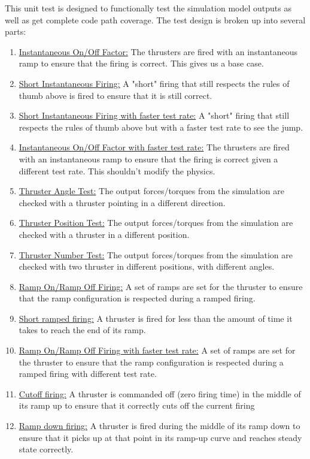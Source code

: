 \noindent This unit test is designed to functionally test the simulation model 
outputs as well as get complete code path coverage.  The test design is broken 
up into several parts:\\
\begin{enumerate}
\item{\underline{Instantaneous On/Off Factor:} The thrusters are fired with an 
  instantaneous ramp to ensure that the firing is correct. This gives us a base case.}
\item{\underline{Short Instantaneous Firing:} A "short" firing that still respects the 
  rules of thumb above is fired to ensure that it is still correct.}
 \item{\underline{Short Instantaneous Firing with faster test rate:} A "short" firing that still respects the 
  rules of thumb above but with a faster test rate to see the jump.}
 \item{\underline{Instantaneous On/Off Factor with faster test rate:} The thrusters are fired with an 
  instantaneous ramp to ensure that the firing is correct given a different test rate. This shouldn't modify the physics.}
 \item{\underline{Thruster Angle Test:} The output forces/torques from the simulation 
  are checked with a thruster pointing in a different direction.}
   \item{\underline{Thruster Position Test:} The output forces/torques from the simulation 
  are checked with a thruster in a different position.}
   \item{\underline{Thruster Number Test:} The output forces/torques from the simulation 
  are checked with two thruster in different positions, with different angles.}
\item{\underline{Ramp On/Ramp Off Firing:} A set of ramps are set for the thruster to ensure 
  that the ramp configuration is respected during a ramped firing.}
  \item{\underline{Short ramped firing:} A thruster is fired for less than the amount of time it 
   takes to reach the end of its ramp.}
\item{\underline{Ramp On/Ramp Off Firing with faster test rate:} A set of ramps are set for the thruster to ensure 
  that the ramp configuration is respected during a ramped firing with different test rate.}
\item{\underline{Cutoff firing:} A thruster is commanded off (zero firing time) in the middle 
   of its ramp up to ensure that it correctly cuts off the current firing}
\item{\underline{Ramp down firing:} A thruster is fired during the middle of its ramp down 
   to ensure that it picks up at that point in its ramp-up curve and reaches 
   steady state correctly.}
\end{enumerate}

